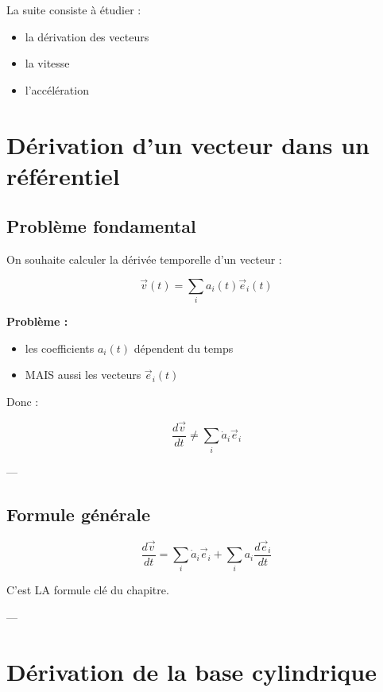 \documentclass[11pt,a4paper]{article}
\begin{document}
\bigskip

La suite consiste à étudier :

\begin{itemize}
\item la dérivation des vecteurs
\item la vitesse
\item l’accélération
\end{itemize}

\section{Dérivation d’un vecteur dans un référentiel}

\subsection{Problème fondamental}

On souhaite calculer la dérivée temporelle d’un vecteur :

\[
\vec{v}(t) = \sum_i a_i(t)\vec{e}_i(t)
\]

\bigskip

\textbf{Problème :}

\begin{itemize}
\item les coefficients $a_i(t)$ dépendent du temps
\item MAIS aussi les vecteurs $\vec{e}_i(t)$
\end{itemize}

\bigskip

Donc :

\[
\frac{d\vec{v}}{dt} \neq \sum_i \dot{a}_i \vec{e}_i
\]

---

\subsection{Formule générale}

\[
\boxed{
\frac{d\vec{v}}{dt}
=
\sum_i \dot{a}_i \vec{e}_i + \sum_i a_i \frac{d\vec{e}_i}{dt}
}
\]

\bigskip

C’est LA formule clé du chapitre.

---

\section{Dérivation de la base cylindrique}
\end{document}
